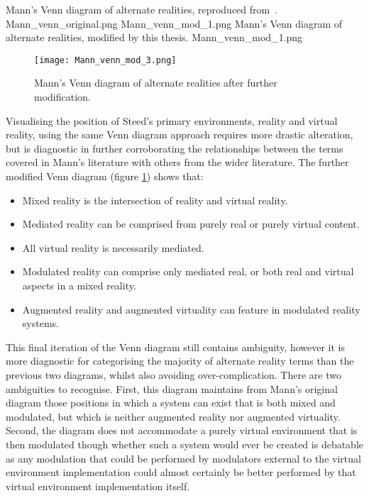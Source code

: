  {Mann's Venn diagram of alternate realities, reproduced from~\cite{Mann2002a}.} {Mann_venn_original.png}
       {Mann_venn_mod_1.png} {Mann's Venn diagram of alternate realities, modified by this thesis.} {Mann_venn_mod_1.png}

\begin{figure}[h]
\centering
  \texttt{[image: Mann\_venn\_mod\_3.png]}
  \caption{Mann's Venn diagram of alternate realities after further modification.}
  \label{Mann_venn_mod_3.png}
\end{figure}

Visualising the position of Steed's primary environments, reality and virtual reality, using the same Venn diagram approach requires more drastic alteration, but is diagnostic in further corroborating the relationships between the terms covered in Mann's literature with others from the wider literature. The further modified Venn diagram (figure \ref{Mann_venn_mod_3.png}) shows that:
\begin{itemize}
	\item Mixed reality is the intersection of reality and virtual reality.
	\item Mediated reality can be comprised from purely real or purely virtual content.
	\item All virtual reality is necessarily mediated.
	\item Modulated reality can comprise only mediated real, or both real and virtual aspects in a mixed reality.
	\item Augmented reality and augmented virtuality can feature in modulated reality systems.
\end{itemize}

This final iteration of the Venn diagram still contains ambiguity, however it is more diagnostic for categorising the majority of alternate reality terms than the previous two diagrams, whilst also avoiding over-complication. There are two ambiguities to recognise. First, this diagram maintains from Mann's original diagram those positions in which a system can exist that is both mixed and modulated, but which is neither augmented reality nor augmented virtuality. Second, the diagram does not accommodate a purely virtual environment that is then modulated though whether such a system would ever be created is debatable as any modulation that could be performed by modulators external to the virtual environment implementation could almost certainly be better performed by that virtual environment implementation itself.


